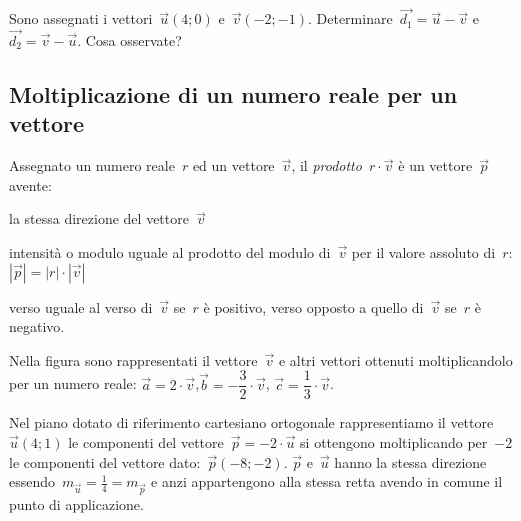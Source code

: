 \begin{esempio}

Sono assegnati i vettori~$\vec{u}(4;0)$ e~$\vec{v}(-2;-1)$. 
Determinare~$\vec{d_1}=\vec{u}-\vec{v}$ e~$\vec{d_2}=\vec{v}-\vec{u}$. Cosa 
osservate?
\begin{center}
 
\end{center}
\end{esempio}

\subsection{Moltiplicazione di un numero reale per un vettore}

\begin{definizione}
Assegnato un numero reale~$r$ ed un vettore~$\vec{v}$, il \emph{prodotto}~$r 
\cdot \vec{v}$ è un vettore~$\vec{p}$ avente:
\begin{enumeratea}
\item la stessa direzione del vettore~$\vec{v}$
\item intensità o modulo uguale al prodotto del modulo di~$\vec{v}$ per il 
valore assoluto di~$r$:
 \subitem $|\vec{p}|=|r| \cdot|\vec{v}|$
\item verso uguale al verso di~$\vec{v}$ se~$r$ è positivo, verso opposto a 
quello di~$\vec{v}$ se~$r$ è negativo.
\end{enumeratea}
\end{definizione}

\begin{esempio}
Nella figura sono rappresentati il vettore~$\vec{v}$ e altri vettori ottenuti 
moltiplicandolo per un numero reale:
$\vec{a}=2 \cdot \vec{v}$,$\vec{b}=-\dfrac{3}{2} \cdot \vec{v}$, 
$\vec{c}=\dfrac{1}{3} \cdot \vec{v}$.
\begin{center}
 
\end{center}

\end{esempio}
\begin{esempio}
Nel piano dotato di riferimento cartesiano ortogonale rappresentiamo il 
vettore~$\vec{u}(4;1)$ le componenti
del vettore~$\vec{p}=-2\cdot \vec{u}$ si ottengono moltiplicando per~$-2$ le 
componenti del vettore dato:~$\vec{p}(-8;-2)$. $\vec{p}$ e~$\vec{u}$
hanno la stessa direzione essendo~$m_{\vec{u}}=\frac{1}{4}=m_{\vec{p}}$ e anzi 
appartengono alla stessa retta avendo in comune il punto di applicazione.
\begin{center}
 
\end{center}
\end{esempio}

